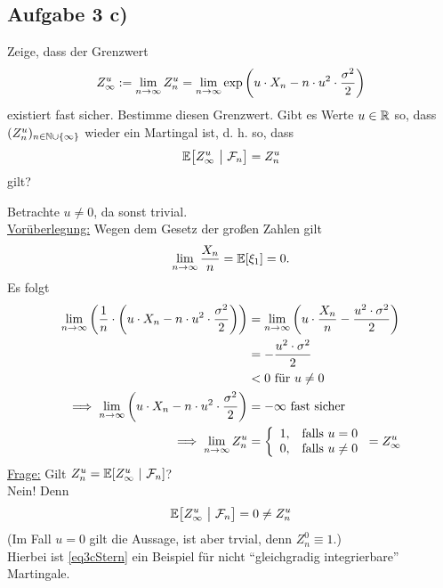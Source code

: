 \documentclass[12pt,a4paper]{article}
\begin{document}
\subsection*{Aufgabe 3 c)}
Zeige, dass der Grenzwert
\begin{align*}
Z_\infty^u:=\lim\limits_{n\to\infty} Z^u_n=\lim\limits_{n\to\infty}\exp\left(u\cdot X_n-n\cdot u^2\cdot\frac{\sigma^2}{2}\right)
\end{align*}
existiert fast sicher. Bestimme diesen Grenzwert. Gibt es Werte $u\in\mathbb{R}$ so, dass $(Z_n^u)_{n\in\mathbb{N}\cup\lbrace\infty\rbrace}$ wieder ein Martingal ist, d. h. so, dass
\begin{align*}
\mathbb{E}\big[Z^u_\infty~\big|~\mathcal{F}_n\big]=Z^u_n
\end{align*}
gilt?

\begin{lösung}
Betrachte $u\neq0$, da sonst trivial.\\

\underline{Vorüberlegung:}
Wegen dem Gesetz der großen Zahlen gilt
\begin{align*}
\lim\limits_{n\to\infty}\frac{X_n}{n}=\mathbb{E}[\xi_1]=0.
\end{align*}
Es folgt
\begin{align*}
\lim\limits_{n\to\infty}\left(\frac{1}{n}\cdot\left( u\cdot X_n-n\cdot u^2\cdot\frac{\sigma^2}{2}\right)\right)
&=\lim\limits_{n\to\infty}\left(u\cdot\frac{X_n}{n}-\frac{u^2\cdot\sigma^2}{2}\right)\\
&=-\frac{u^2\cdot\sigma^2}{2}\\
&<0\text{ für }u\neq0\\
\implies
\lim\limits_{n\to\infty}\left( u\cdot X_n-n\cdot u^2\cdot\frac{\sigma^2}{2}\right)&=-\infty\text{ fast sicher }\\
\implies
\lim\limits_{n\to\infty} Z_n^u&=\left\lbrace\begin{array}{cl}
1, & \text{falls } u=0\\
0, & \text{falls } u\neq 0
\end{array}\right.
=Z_\infty^u
\end{align*}
\underline{Frage:} Gilt $Z_n^u=\mathbb{E}[Z_\infty^u~|~\mathcal{F}_n]$?\\
Nein! Denn 
\begin{align}\label{eq3cStern}
\mathbb{E}\big[Z_\infty^u~\big|~\mathcal{F}_n\big]=0\neq Z_n^u
\end{align}
(Im Fall $u=0$ gilt die Aussage, ist aber trvial, denn $Z_n^0\equiv 1$.)\\
Hierbei ist \eqref{eq3cStern} ein Beispiel für nicht ``gleichgradig integrierbare'' Martingale.
\end{lösung}
\end{document}
